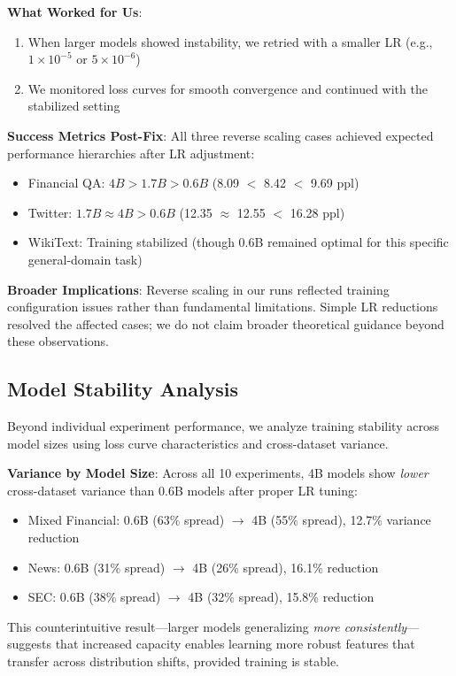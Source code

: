 \textbf{What Worked for Us}:
\begin{enumerate}
\item When larger models showed instability, we retried with a smaller LR (e.g., $1\times10^{-5}$ or $5\times10^{-6}$)
\item We monitored loss curves for smooth convergence and continued with the stabilized setting
\end{enumerate}

\textbf{Success Metrics Post-Fix}: All three reverse scaling cases achieved expected performance hierarchies after LR adjustment:
\begin{itemize}
\item Financial QA: $4B > 1.7B > 0.6B$ (8.09 $<$ 8.42 $<$ 9.69 ppl)
\item Twitter: $1.7B \approx 4B > 0.6B$ (12.35 $\approx$ 12.55 $<$ 16.28 ppl)
\item WikiText: Training stabilized (though 0.6B remained optimal for this specific general-domain task)
\end{itemize}

\textbf{Broader Implications}: Reverse scaling in our runs reflected training configuration issues rather than fundamental limitations. Simple LR reductions resolved the affected cases; we do not claim broader theoretical guidance beyond these observations.

\subsection{Model Stability Analysis}

Beyond individual experiment performance, we analyze training stability across model sizes using loss curve characteristics and cross-dataset variance.

\textbf{Variance by Model Size}: Across all 10 experiments, 4B models show \textit{lower} cross-dataset variance than 0.6B models after proper LR tuning:
\begin{itemize}
\item Mixed Financial: 0.6B (63\% spread) $\to$ 4B (55\% spread), 12.7\% variance reduction
\item News: 0.6B (31\% spread) $\to$ 4B (26\% spread), 16.1\% reduction
\item SEC: 0.6B (38\% spread) $\to$ 4B (32\% spread), 15.8\% reduction
\end{itemize}

This counterintuitive result---larger models generalizing \textit{more consistently}---suggests that increased capacity enables learning more robust features that transfer across distribution shifts, provided training is stable.

